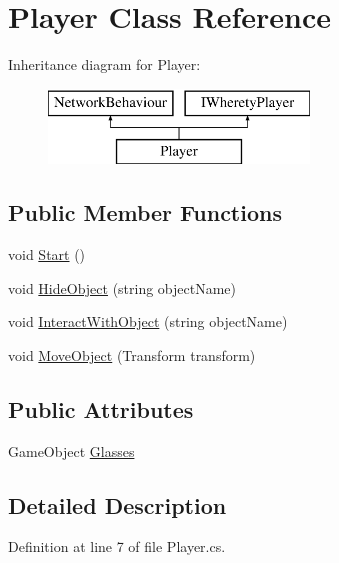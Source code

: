 \hypertarget{class_player}{}\section{Player Class Reference}
\label{class_player}
Inheritance diagram for Player\+:\begin{figure}[H]
\begin{center}
\leavevmode
\includegraphics[height=2.000000cm]{class_player}
\end{center}
\end{figure}
\subsection*{Public Member Functions}
\begin{DoxyCompactItemize}
\item 
void \mbox{\hyperlink{class_player_a1a09a3ded16ac1646f6bdd4f25fe0ddd}{Start}} ()
\item 
void \mbox{\hyperlink{class_player_ab1b799d89cacee820f5a1e83cf71b440}{Hide\+Object}} (string object\+Name)
\item 
void \mbox{\hyperlink{class_player_ac4db0b8b352f511d0d0715f755876c4e}{Interact\+With\+Object}} (string object\+Name)
\item 
void \mbox{\hyperlink{class_player_ac8cf603009908d2e9b95fc4aff6ced70}{Move\+Object}} (Transform transform)
\end{DoxyCompactItemize}
\subsection*{Public Attributes}
\begin{DoxyCompactItemize}
\item 
Game\+Object \mbox{\hyperlink{class_player_aa5b58a5ebfa1552e054794a7133ade51}{Glasses}}
\end{DoxyCompactItemize}


\subsection{Detailed Description}


Definition at line 7 of file Player.\+cs.



